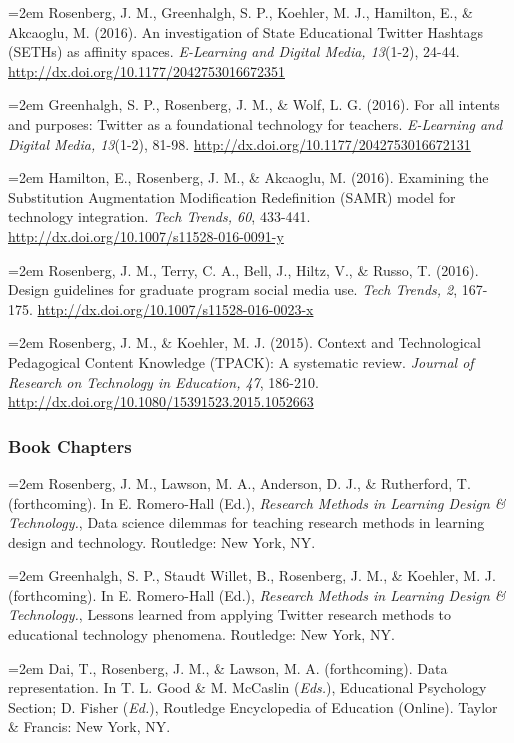 \documentclass[14,]{article}
\begin{document}
\hangindent=2em Rosenberg, J. M., Greenhalgh, S. P., Koehler, M. J.,
Hamilton, E., \& Akcaoglu, M. (2016). An investigation of State
Educational Twitter Hashtags (SETHs) as affinity spaces.
\emph{E-Learning and Digital Media, 13}(1-2), 24-44.
\url{http://dx.doi.org/10.1177/2042753016672351}

\hangindent=2em Greenhalgh, S. P., Rosenberg, J. M., \& Wolf, L. G.
(2016). For all intents and purposes: Twitter as a foundational
technology for teachers. \emph{E-Learning and Digital Media, 13}(1-2),
81-98. \url{http://dx.doi.org/10.1177/2042753016672131}

\hangindent=2em Hamilton, E., Rosenberg, J. M., \& Akcaoglu, M. (2016).
Examining the Substitution Augmentation Modification Redefinition (SAMR)
model for technology integration. \emph{Tech Trends, 60}, 433-441.
\url{http://dx.doi.org/10.1007/s11528-016-0091-y}

\hangindent=2em Rosenberg, J. M., Terry, C. A., Bell, J., Hiltz, V., \&
Russo, T. (2016). Design guidelines for graduate program social media
use. \emph{Tech Trends, 2}, 167-175.
\url{http://dx.doi.org/10.1007/s11528-016-0023-x}

\hangindent=2em Rosenberg, J. M., \& Koehler, M. J. (2015). Context and
Technological Pedagogical Content Knowledge (TPACK): A systematic
review. \emph{Journal of Research on Technology in Education, 47},
186-210. \url{http://dx.doi.org/10.1080/15391523.2015.1052663}

\hypertarget{book-chapters}{%
\subsubsection{Book Chapters}\label{book-chapters}}

\hangindent=2em Rosenberg, J. M., Lawson, M. A., Anderson, D. J., \&
Rutherford, T. (forthcoming). In E. Romero-Hall (Ed.), \emph{Research
Methods in Learning Design \& Technology.}, Data science dilemmas for
teaching research methods in learning design and technology. Routledge:
New York, NY.

\hangindent=2em Greenhalgh, S. P., Staudt Willet, B., Rosenberg, J. M.,
\& Koehler, M. J. (forthcoming). In E. Romero-Hall (Ed.), \emph{Research
Methods in Learning Design \& Technology.}, Lessons learned from
applying Twitter research methods to educational technology phenomena.
Routledge: New York, NY.

\hangindent=2em Dai, T., Rosenberg, J. M., \& Lawson, M. A.
(forthcoming). Data representation. In T. L. Good \& M. McCaslin
(\emph{Eds.}), Educational Psychology Section; D. Fisher (\emph{Ed.}),
Routledge Encyclopedia of Education (Online). Taylor \& Francis: New
York, NY.
\end{document}
